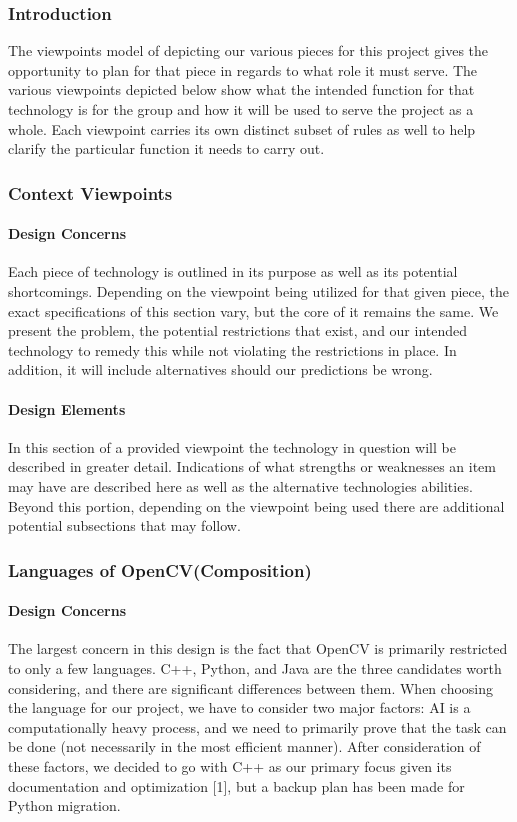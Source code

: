 \documentclass[article, onecolumn, draftclsnofoot,10pt, compsoc]{IEEEtran}
\begin{document}
\subsubsection{Introduction}
The viewpoints model of depicting our various pieces for this project gives the opportunity to plan for that piece in regards to what role it must serve. The various viewpoints depicted below show what the intended function for that technology is for the group and how it will be used to serve the project as a whole. Each viewpoint carries its own distinct subset of rules as well to help clarify the particular function it needs to carry out. 

\subsubsection{Context Viewpoints}
\paragraph{Design Concerns}
Each piece of technology is outlined in its purpose as well as its potential shortcomings. Depending on the viewpoint being utilized for that given piece, the exact specifications of this section vary, but the core of it remains the same. We present the problem, the potential restrictions that exist, and our intended technology to remedy this while not violating the restrictions in place. In addition, it will include alternatives should our predictions be wrong.

\paragraph{Design Elements}
In this section of a provided viewpoint the technology in question will be described in greater detail. Indications of what strengths or weaknesses an item may have are described here as well as the alternative technologies abilities. Beyond this portion, depending on the viewpoint being used there are additional potential subsections that may follow.

\subsubsection{Languages of OpenCV(Composition)}
\paragraph{Design Concerns}
The largest concern in this design is the fact that OpenCV is primarily restricted to only a few languages. C++, Python, and Java are the three candidates worth considering, and there are significant differences between them. When choosing the language for our project, we have to consider two major factors: AI is a computationally heavy process, and we need to primarily prove that the task can be done (not necessarily in the most efficient manner). After consideration of these factors, we decided to go with C++ as our primary focus given its documentation and optimization [1], but a backup plan has been made for Python migration.
\end{document}

